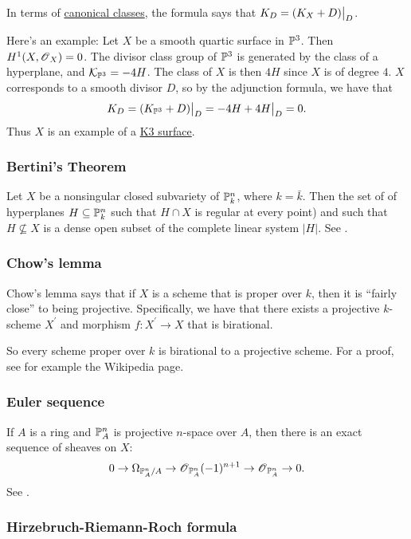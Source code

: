 \documentclass[11pt, english]{article}
\begin{document}
In terms of \hyperref[canonicaldivisor]{canonical classes}, the formula says that $K_D = \restr{(K_X + D)}{D}$. 

Here's an example: Let $X$ be a smooth quartic surface in $\mathbb{P}^3$. Then $H^1(X,\operatorname{\mathscr{O}}_X)=0$. The divisor class group of $\mathbb{P}^3$ is generated by the class of a hyperplane, and $\mathcal K_{\mathbb{P}^3}=-4H$. The class of $X$ is then $4H$ since $X$ is of degree $4$. $X$ corresponds to a smooth divisor $D$, so by the adjunction formula, we have that
\[
K_D = \restr{(K_{\PP^3}+D)}{D} = \restr{-4H+4H}{D} = 0.
\]
Thus $X$ is an example of a \hyperref[k3]{K3 surface}. 


\subsubsection{Bertini's Theorem}
\label{bertini}
Let $X$ be a nonsingular closed subvariety of $\mathbb{P}_k^n$, where $k=\bar k$. Then the set of of hyperplanes $H \subseteq \mathbb{P}_k^n$ such that $H \cap X$ is regular at every point) and such that $H\not  \subseteq X$ is a dense open subset of the complete linear system $|H|$. See \cite[Thm II.8.18]{hartshorne}.

\subsubsection{Chow's lemma}
\label{chowslemma}

Chow's lemma says that if $X$ is a scheme that is proper over $k$, then it is ``fairly close'' to being projective. Specifically, we have that there exists a projective $k$-scheme $X^\prime$ and morphism $f:X^\prime \to X$ that is birational.

So every scheme proper over $k$ is birational to a projective scheme. For a proof, see for example the Wikipedia page.

\subsubsection{Euler sequence}
\label{eulersequence}
If $A$ is a ring and $\mathbb{P}_A^n$ is projective $n$-space over $A$, then there is an exact sequence of sheaves on $X$:
\[
0 \to \Omega_{\mathbb{P}^n_A/A} \to \operatorname{\mathscr{O}}_{\mathbb{P}^n_A}(-1)^{n+1} \to \operatorname{\mathscr{O}}_{\mathbb{P}_A^n} \to 0.
\]
See \cite[Thm II.8.13]{hartshorne}.

\subsubsection{Hirzebruch-Riemann-Roch formula}
\label{hirzebruchriemannroch}
\end{document}
